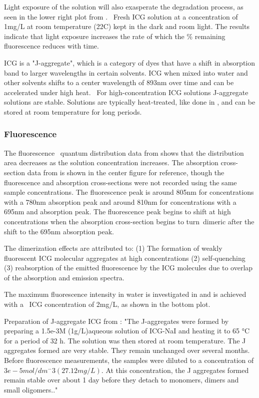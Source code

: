 Light exposure of the solution will also exasperate the degradation process, as seen in the lower right plot from \cite{saxena}.  Fresh ICG solution at a concentration of 1mg/L at room temperature (22C) kept in the dark and room light. The results indicate that light exposure increases the rate of which the \% remaining fluorescence reduces with time. 


ICG is a "J-aggregate", which is a category of dyes that have a shift in absorption band to larger wavelengths in certain solvents. ICG when mixed into water and other solvents shifts to a center wavelength of 893nm over time and can be accelerated under high heat. 
For high-concentration ICG solutions J-aggregate solutions are stable. Solutions are typically heat-treated, like done in \cite{rotermund}, and can be stored at room temperature for long periods. 


\subsubsection{ Fluorescence}
The fluorescence  quantum distribution data from \cite{philip} shows that the distribution area decreases as the solution concentration increases. The absorption cross-section data from \cite{philip} is shown in the center figure for reference, though the fluorescence and absorption cross-sections were not recorded using the same sample concentrations. The fluorescence peak is around 805nm for concentrations with a 780nm absorption peak and around 810nm for concentrations with a 695nm and absorption peak. The fluorescence peak begins to shift at high concentrations when the absorption cross-section begins to turn dimeric after the shift to the 695nm absorption peak.  

The dimerization effects are attributed to:
(1) The formation of weakly fluorescent ICG molecular aggregates at high concentrations
(2) self-quenching
(3) reabsorption of the emitted fluorescence by the ICG molecules due to overlap of the absorption and emission spectra.

The maximum fluorescence intensity in water is investigated in \cite{saxena} and is achieved with a  ICG concentration of 2mg/L, as shown in the bottom plot. 

Preparation of J-aggregate ICG from \cite{rotermund}:
"The J-aggregates were formed by preparing a 1.5e-3M (1g/L)aqueous solution of ICG-NaI and heating it to 65 °C for a period of 32 h. The solution was then stored at room temperature. The J aggregates formed are very stable. They remain unchanged over several months. Before fluorescence measurements, the samples were diluted to a concentration of $3e-5mol/dm^-3 (27.12mg/L)$. At this concentration, the J aggregates formed remain stable over about 1 day before they detach to monomers, dimers and small oligomers.."


